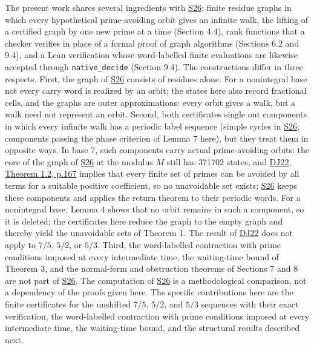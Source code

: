 \documentclass[11pt,reqno]{amsart}
\theoremstyle{definition}
\theoremstyle{remark}
\begin{document}
The present work shares several ingredients with \hyperref[ref-s26]{S26}:
finite residue graphs in which every hypothetical prime-avoiding orbit
gives an infinite walk, the lifting of a certified graph by one new prime
at a time (Section 4.4), rank functions that a checker verifies in
place of a formal proof of graph algorithms (Sections 6.2 and 9.4), and a
Lean verification whose word-labelled finite evaluations are likewise
accepted through \nolinkurl{native_decide} (Section 9.4). The
constructions differ in three respects. First, the graph of
\hyperref[ref-s26]{S26} consists of residues alone. For a nonintegral base
not every carry word is realized by an orbit; the states here also record
fractional cells, and the graphs are outer approximations: every orbit
gives a walk, but a walk need not represent an orbit. Second, both
certificates single out components in which every infinite walk has a
periodic label sequence (simple cycles in \hyperref[ref-s26]{S26};
components passing the phase criterion of Lemma 7 here), but they treat
them in opposite ways. In base \(7\), such components carry actual
prime-avoiding orbits: the core of the graph of \hyperref[ref-s26]{S26}
at the modulus \(M\) still has 371702 states, and
\hyperref[ref-dj22]{DJ22, Theorem 1.2, p.167} implies that every finite
set of primes can be avoided by all terms for a suitable positive
coefficient, so no unavoidable set exists; \hyperref[ref-s26]{S26} keeps
these components and applies the return theorem to their periodic words.
For a nonintegral base, Lemma 4 shows that no orbit remains in such a
component, so it is deleted; the certificates here reduce the graph to
the empty graph and thereby yield the unavoidable sets of Theorem 1. The
result of \hyperref[ref-dj22]{DJ22} does not apply to \(7/5\), \(5/2\), or \(5/3\).
Third, the word-labelled contraction with prime conditions imposed at
every intermediate time, the waiting-time bound of Theorem 3, and the
normal-form and obstruction theorems of Sections 7 and 8 are not part of
\hyperref[ref-s26]{S26}. The computation of \hyperref[ref-s26]{S26} is a
methodological comparison, not a dependency of the proofs given here.
The specific contributions here are the finite certificates for the
unshifted \(7/5\), \(5/2\), and \(5/3\) sequences with their exact verification,
the word-labelled contraction with prime conditions imposed at every
intermediate time, the waiting-time bound, and the structural results
described next.
\end{document}
